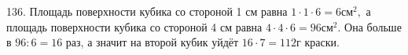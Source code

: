 136. Площадь поверхности кубика со стороной 1 см равна $1\cdot1\cdot6=6\text{см}^2,$ а площадь поверхности кубика со стороной 4 см равна $4\cdot4\cdot6=96\text{см}^2.$ Она больше в $96:6=16$ раз, а значит на второй кубик уйдёт $16\cdot7=112$г краски.\\
